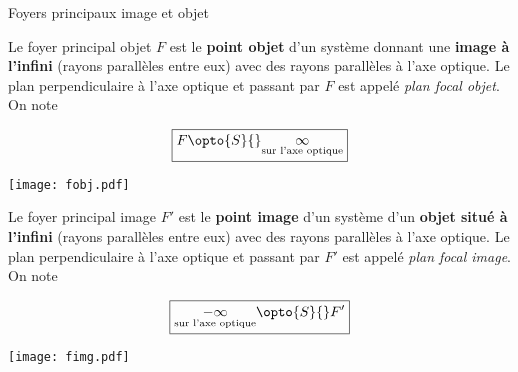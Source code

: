 \documentclass[../main/main.tex]{subfiles}
\begin{document}
\begin{defi}[label=def:foy, sidebyside]{Foyers principaux image et objet}

    Le foyer principal objet $F$ est le \textbf{point objet} d'un système
    donnant une \textbf{image à l'infini} (rayons parallèles entre eux) avec des
    rayons parallèles à l'axe optique. Le plan perpendiculaire à l'axe optique
    et passant par $F$ est appelé \textit{plan focal objet}. On note

    \[\boxed{F \opto{S}{} \underset{\text{sur l'axe optique}}{\infty}}\]
    \begin{center}
        \texttt{[image: fobj.pdf]}
        \label{fig:fobj}
    \end{center}
    
    \tcblower

    Le foyer principal image $F'$ est le \textbf{point image} d'un système d'un
    \textbf{objet situé à l'infini} (rayons parallèles entre eux) avec des
    rayons parallèles à l'axe optique. Le plan perpendiculaire à l'axe optique
    et passant par $F'$ est appelé \textit{plan focal image}. On note

    \[\boxed{\underset{\text{sur l'axe optique}}{-\infty} \opto{S}{} F'}\]
    \begin{center}
        \texttt{[image: fimg.pdf]}
        \label{fig:fimg}
    \end{center}
    
\end{defi}
\end{document}

